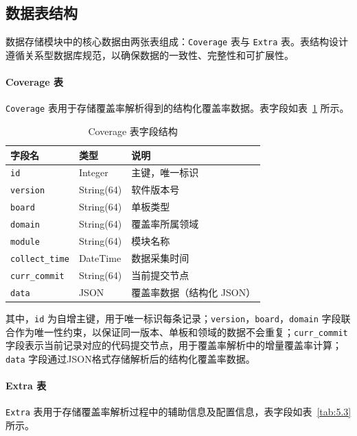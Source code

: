 \subsection{数据表结构}

数据存储模块中的核心数据由两张表组成：\texttt{Coverage} 表与 \texttt{Extra} 表。表结构设计遵循关系型数据库规范，以确保数据的一致性、完整性和可扩展性。

\paragraph{Coverage 表}
\texttt{Coverage} 表用于存储覆盖率解析得到的结构化覆盖率数据。表字段如表~\ref{tab:5.2} 所示。

\begin{table}
    \centering
    \caption{Coverage 表字段结构}
    \label{tab:5.2}
    \begin{tabular}{lll}
        \toprule
        字段名 & 类型 & 说明 \\
        \midrule
        \verb|id| & Integer & 主键，唯一标识 \\
        \verb|version| & String(64) & 软件版本号 \\
        \verb|board| & String(64) & 单板类型 \\
        \verb|domain| & String(64) & 覆盖率所属领域 \\
        \verb|module| & String(64) & 模块名称 \\
        \verb|collect_time| & DateTime & 数据采集时间 \\
        \verb|curr_commit| & String(64) & 当前提交节点 \\
        \verb|data| & JSON & 覆盖率数据（结构化 JSON） \\
        \bottomrule
    \end{tabular}
\end{table}

其中，\verb|id| 为自增主键，用于唯一标识每条记录；\verb|version|，\verb|board|，\verb|domain| 字段联合作为唯一性约束，以保证同一版本、单板和领域的数据不会重复；\verb|curr_commit|字段表示当前记录对应的代码提交节点，用于覆盖率解析中的增量覆盖率计算；\verb|data| 字段通过JSON格式存储解析后的结构化覆盖率数据。

\paragraph{Extra 表}
\texttt{Extra} 表用于存储覆盖率解析过程中的辅助信息及配置信息，表字段如表~\ref{tab:5.3} 所示。

